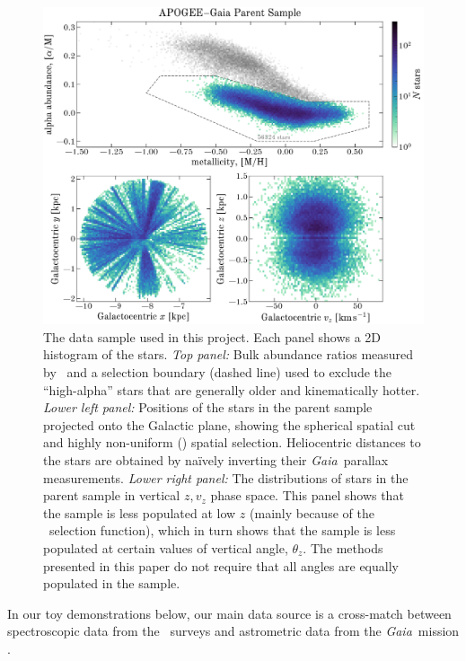 \documentclass[modern]{aastex63}
\newcommand{\gaia}{\textsl{Gaia}}
\newcommand{\apogee}{\acronym{APOGEE}}
\begin{document}
\begin{figure}[!tp]
  \begin{center}
  \includegraphics[width=\textwidth]{apogee-rgb-loalpha-mh-am-xy.pdf}
  \end{center}
  \caption{%
    The data sample used in this project.
    Each panel shows a 2D histogram of the stars.
    \textsl{Top panel:}
    Bulk abundance ratios measured by \apogee\ and a selection boundary (dashed
    line) used to exclude the ``high-alpha'' stars that are generally older and
    kinematically hotter.
    \textsl{Lower left panel:}
    Positions of the stars in the parent sample projected onto the Galactic
    plane, showing the spherical spatial cut and highly non-uniform (\apogee)
    spatial selection.
    Heliocentric distances to the stars are obtained by na\"ively inverting
    their \gaia\ parallax measurements.
    \textsl{Lower right panel:}
    The distributions of stars in the parent sample in vertical $z, v_z$ phase
    space.
    This panel shows that the sample is less populated at low $z$ (mainly
    because of the \apogee\ selection function), which in turn shows that the
    sample is less populated at certain values of vertical angle, $\theta_z$.
    The methods presented in this paper do not require that all angles are
    equally populated in the sample.
    \label{fig:mh-am-xy}
    }
\end{figure}

In our toy demonstrations below, our main data source is a cross-match between
spectroscopic data from the \apogee\ surveys \citep{Majewski:2017} and
astrometric data from the \gaia\ mission \citep{Gaia-Collaboration:2016,
Gaia-Collaboration:2018}.
\end{document}
